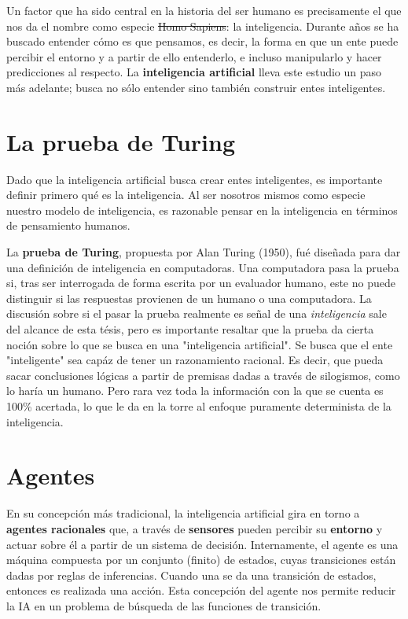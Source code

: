Un factor que ha sido central en la historia del ser humano es
precisamente el que nos da el nombre como especie \sout{Homo Sapiens}:
la inteligencia. Durante años se ha buscado entender cómo es que pensamos,
es decir, la forma en que un ente puede percibir el entorno y a partir
de ello entenderlo, e incluso manipularlo y hacer predicciones al respecto.
La \textbf{inteligencia artificial} lleva este estudio un paso más adelante;
busca no sólo entender sino también construir entes inteligentes.

\section{La prueba de Turing}
Dado que la inteligencia artificial busca crear entes inteligentes,
es importante definir primero qué es la inteligencia. Al ser nosotros
mismos como especie nuestro modelo de inteligencia, es razonable pensar
en la inteligencia en términos de pensamiento humanos.

La \textbf{prueba de Turing}, propuesta por Alan Turing (1950), fué diseñada
para dar una definición de inteligencia en computadoras. Una computadora pasa
la prueba si, tras ser interrogada de forma escrita por un evaluador humano,
este no puede distinguir si las respuestas provienen de un humano o una computadora.
La discusión sobre si el pasar la prueba realmente es señal de una \textit{inteligencia}
sale del alcance de esta tésis, pero es importante resaltar que la prueba da
cierta noción sobre lo que se busca en una "inteligencia artificial".
Se busca que el ente "inteligente" sea capáz de tener un razonamiento racional.
Es decir, que pueda sacar conclusiones lógicas a partir de premisas dadas a través
de silogismos, como lo haría un humano. Pero rara vez toda la información con la que
se cuenta es 100\% acertada, lo que le da en la torre al enfoque puramente
determinista de la inteligencia.

\section{Agentes}
En su concepción más tradicional, la inteligencia artificial gira en torno a
\textbf{agentes racionales} que, a través de \textbf{sensores} pueden percibir
su \textbf{entorno} y actuar sobre él a partir de un sistema de decisión.
Internamente, el agente es una máquina compuesta por un conjunto (finito) de estados,
cuyas transiciones están dadas por reglas de inferencias. Cuando una se da una
transición de estados, entonces es realizada una acción. Esta concepción del agente
nos permite reducir la IA en un problema de búsqueda de las funciones de transición.

